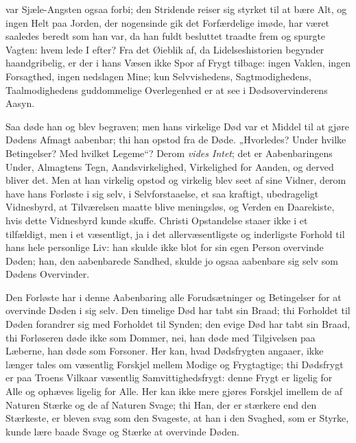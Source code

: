 \documentclass[12pt]{book}
\begin{document}
var Sjæle-Angsten ogsaa forbi; den Stridende reiser sig styrket til
at bære Alt, og ingen Helt paa Jorden, der nogensinde gik det
Forfærdelige imøde, har været saaledes beredt som han var, da han
fuldt besluttet traadte frem og spurgte Vagten: hvem lede I efter?
Fra
det Øieblik af, da Lidelseshistorien begynder haandgribelig, er der
i hans Væsen ikke Spor af Frygt tilbage: ingen Vaklen, ingen
Forsagthed, ingen nedslagen Mine; kun Selvvishedens,
Sagtmodighedens, Taalmodighedens guddommelige Overlegenhed er at see
i Dødsovervinderens Aasyn.

Saa døde han og blev begraven; men hans virkelige Død var et Middel
til at gjøre Dødens Afmagt aabenbar; thi han opstod fra de Døde.
„Hvorledes? Under hvilke Betingelser? Med hvilket Legeme“? Derom
\emph{vides Intet}; det er Aabenbaringens Under, Almagtens Tegn,
Aandsvirkelighed, Virkelighed for Aanden, og derved bliver det. Men
at han virkelig opstod og virkelig blev seet af sine Vidner, derom
have hans Forløste i sig selv, i Selvforstaaelse, et saa kraftigt,
ubedrageligt Vidnesbyrd, at Tilværelsen maatte blive meningsløs, og
Verden en Daarekiste, hvis dette Vidnesbyrd kunde skuffe. Christi
Opstandelse staaer ikke i et tilfældigt, men i et væsentligt, ja i
det allervæsentligste og inderligste Forhold til hans hele
personlige Liv: han skulde ikke blot for sin egen Person overvinde
Døden; han, den aabenbarede Sandhed, skulde jo ogsaa aabenbare sig
selv som Dødens Overvinder.

Den Forløste har i denne Aabenbaring alle Forudsætninger og
Betingelser for at overvinde Døden i sig selv. Den timelige Død har
tabt sin Braad; thi Forholdet til Døden forandrer sig med Forholdet
til Synden; den evige Død har tabt sin Braad, thi Forløseren døde
ikke som Dommer, nei, han døde med Tilgivelsen paa Læberne, han døde
som Forsoner. Her kan, hvad Dødsfrygten angaaer, ikke længer tales
om væsentlig Forskjel mellem Modige og Frygtagtige; thi Dødsfrygt er
paa Troens Vilkaar væsentlig Samvittighedsfrygt: denne Frygt er
ligelig for Alle og ophæves ligelig for Alle. Her kan ikke mere
gjøres Forskjel imellem de af Naturen Stærke og de af Naturen Svage;
thi Han, der
er stærkere end den Stærkeste, er bleven svag som den Svageste, at
han i den Svaghed, som er Styrke, kunde lære baade Svage og Stærke
at overvinde Døden.
\end{document}
